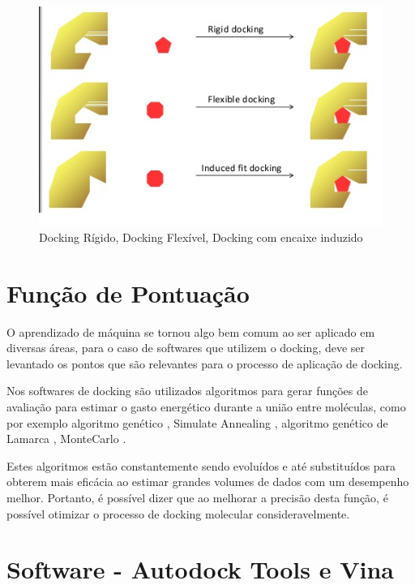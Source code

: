 \documentclass[tcc, capa]{texucpel}
\begin{document}
      \begin{figure}[!htb]
	\centering
	\includegraphics[width=15cm]{imagens/rigido_flexivel.png}
	\caption{Docking Rígido, Docking Flexível, Docking com encaixe induzido}
	\end{figure}

\section{Função de Pontuação}
O aprendizado de máquina se tornou algo bem comum ao ser aplicado em diversas áreas, para o caso de softwares que utilizem o docking, deve ser levantado os pontos que são relevantes para o processo de aplicação de docking.

Nos softwares de docking são utilizados algoritmos para gerar funções de avaliação para estimar o gasto energético durante a união entre moléculas, como por exemplo algoritmo genético \cite{holland1975adaptation}, Simulate Annealing \cite{kirkpatrick1984optimization},  algoritmo genético de Lamarca \cite{morris1998automated},  MonteCarlo \cite{caflisch1992monte}.

Estes algoritmos estão constantemente sendo evoluídos e até substituídos para obterem mais eficácia ao estimar grandes volumes de dados com um desempenho melhor.
Portanto, é possível dizer que ao melhorar a precisão desta função, é possível otimizar o processo de docking molecular consideravelmente.

\section{Software - Autodock Tools e Vina}
\end{document}
